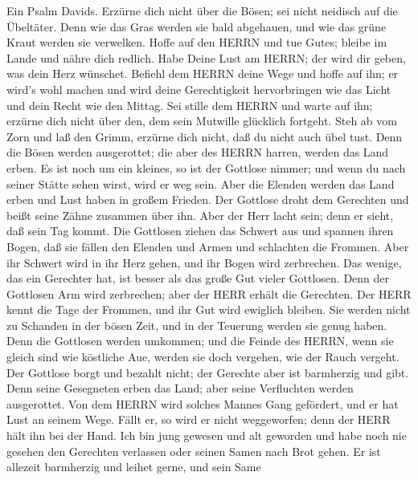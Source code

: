  Ein Psalm Davids. Erzürne dich nicht über die Bösen; sei
nicht neidisch auf die Übeltäter.  Denn wie das Gras werden
sie bald abgehauen, und wie das grüne Kraut werden sie verwelken.
 Hoffe auf den HERRN und tue Gutes; bleibe im Lande und
nähre dich redlich.  Habe Deine Lust am HERRN; der wird dir
geben, was dein Herz wünschet.  Befiehl dem HERRN deine Wege
und hoffe auf ihn; er wird's wohl machen  und wird deine
Gerechtigkeit hervorbringen wie das Licht und dein Recht wie den Mittag.
 Sei stille dem HERRN und warte auf ihn; erzürne dich nicht
über den, dem sein Mutwille glücklich fortgeht.  Steh ab vom
Zorn und laß den Grimm, erzürne dich nicht, daß du nicht auch übel tust.
 Denn die Bösen werden ausgerottet; die aber des HERRN
harren, werden das Land erben.  Es ist noch um ein kleines,
so ist der Gottlose nimmer; und wenn du nach seiner Stätte sehen wirst,
wird er weg sein.  Aber die Elenden werden das Land erben
und Lust haben in großem Frieden.  Der Gottlose droht dem
Gerechten und beißt seine Zähne zusammen über ihn.  Aber
der Herr lacht sein; denn er sieht, daß sein Tag kommt. 
Die Gottlosen ziehen das Schwert aus und spannen ihren Bogen, daß sie
fällen den Elenden und Armen und schlachten die Frommen. 
Aber ihr Schwert wird in ihr Herz gehen, und ihr Bogen wird zerbrechen.
 Das wenige, das ein Gerechter hat, ist besser als das
große Gut vieler Gottlosen.  Denn der Gottlosen Arm wird
zerbrechen; aber der HERR erhält die Gerechten.  Der HERR
kennt die Tage der Frommen, und ihr Gut wird ewiglich bleiben.
 Sie werden nicht zu Schanden in der bösen Zeit, und in der
Teuerung werden sie genug haben.  Denn die Gottlosen werden
umkommen; und die Feinde des HERRN, wenn sie gleich sind wie köstliche
Aue, werden sie doch vergehen, wie der Rauch vergeht.  Der
Gottlose borgt und bezahlt nicht; der Gerechte aber ist barmherzig und
gibt.  Denn seine Gesegneten erben das Land; aber seine
Verfluchten werden ausgerottet.  Von dem HERRN wird solches
Mannes Gang gefördert, und er hat Lust an seinem Wege. 
Fällt er, so wird er nicht weggeworfen; denn der HERR hält ihn bei der
Hand.  Ich bin jung gewesen und alt geworden und habe noch
nie gesehen den Gerechten verlassen oder seinen Samen nach Brot gehen.
 Er ist allezeit barmherzig und leihet gerne, und sein Same
